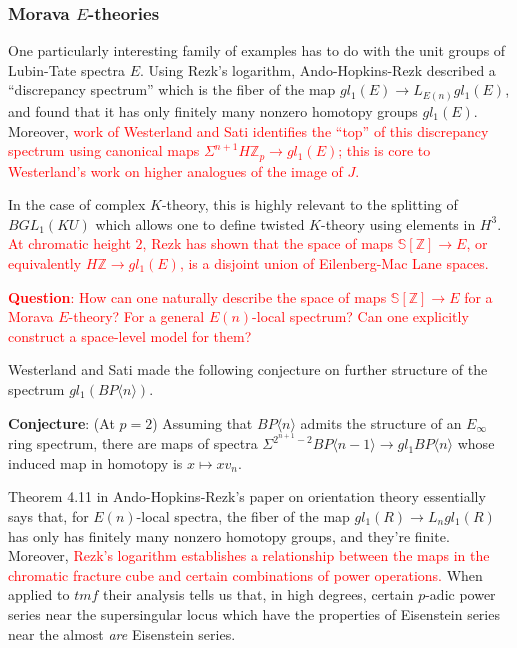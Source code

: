 \documentclass[12pt,titlepage]{article}
\newcommand{\rd}[1]{{\textcolor{red}{#1}}}
\theoremstyle{plain}
\theoremstyle{definition}
\theoremstyle{remark}
\begin{document}
\hypertarget{morava_theories_4}{}\subsubsection{{Morava $E$-theories}}\label{morava_theories_4}

One particularly interesting family of examples has to do with the unit groups of Lubin-Tate spectra $E$. Using Rezk'{}s logarithm, Ando-Hopkins-Rezk described a ``{}discrepancy spectrum''{} which is the fiber of the map $gl_1(E) \to L_{E(n)} gl_1(E)$, and found that it has only finitely many nonzero homotopy groups $gl_1(E)$. Moreover, \rd{work of Westerland and Sati identifies the ``{}top''{} of this discrepancy spectrum using canonical maps $\Sigma^{n+1} H\mathbb{Z}_p \to
gl_1(E)$; this is core to Westerland'{}s work on higher analogues of the image of $J$.}

In the case of complex $K$-theory, this is highly relevant to the splitting of $BGL_1(KU)$ which allows one to define twisted $K$-theory using elements in $H^3$. \rd{At chromatic height $2$, Rezk has shown that the space of maps $\mathbb{S}[\mathbb{Z}] \to E$, or equivalently $H\mathbb{Z} \to gl_1(E)$, is a disjoint union of Eilenberg-Mac Lane spaces.}

\rd{\textbf{Question}: How can one naturally describe the space of maps $\mathbb{S}[\mathbb{Z}] \to E$ for a Morava $E$-theory? For a general $E(n)$-local spectrum? Can one explicitly construct a space-level model for them?}

Westerland and Sati made the following conjecture on further structure of the spectrum $gl_1(BP\langle n\rangle)$.

\textbf{Conjecture}: (At $p=2$) Assuming that $BP\langle n\rangle$ admits the structure of an $E_\infty$ ring spectrum, there are maps of spectra $\Sigma^{2^{n+1}-2} BP\langle{n-1}\rangle \to gl_1 BP\langle
n\rangle$ whose induced map in homotopy is $x \mapsto x v_n$.

Theorem 4.11 in Ando-Hopkins-Rezk'{}s paper on orientation theory essentially says that, for $E(n)$-local spectra, the fiber of the map $gl_1(R) \to L_n gl_1(R)$ has only has finitely many nonzero homotopy groups, and they'{}re finite. Moreover, \rd{Rezk'{}s logarithm establishes a relationship between the maps in the chromatic fracture cube and certain combinations of power operations.} When applied to $tmf$ their analysis tells us that, in high degrees, certain $p$-adic power series near the supersingular locus which have the properties of Eisenstein series near the almost \emph{are} Eisenstein series.
\end{document}
